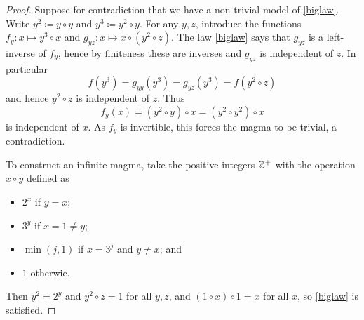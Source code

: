 \begin{proof}  Suppose for contradiction that we have a non-trivial model of \eqref{biglaw}. Write $y^2 \coloneqq y \circ y$ and $y^3 \coloneqq y^2 \circ y$. For any $y,z$, introduce the functions $f_y: x \mapsto y^3 \circ x$ and $g_{yz}: x \mapsto x \circ (y^2 \circ z)$.  The law \eqref{biglaw} says that $g_{yz}$ is a left-inverse of $f_y$, hence by finiteness these are inverses and $g_{yz}$ is independent of $z$. In particular
$$ f(y^3) = g_{yy}(y^3) = g_{yz}(y^3) = f(y^2 \circ z)$$
and hence $y^2 \circ z$ is independent of $z$.  Thus
$$ f_y(x) = (y^2 \circ y) \circ x = (y^2 \circ y^2) \circ x$$
is independent of $x$.  As $f_y$ is invertible, this forces the magma to be trivial, a contradiction.

To construct an infinite magma, take the positive integers $\mathbb{Z}^+$ with the operation $x \circ y$ defined as
\begin{itemize}
  \item $2^x$ if $y=x$;
  \item $3^y$ if $x = 1 \neq y$;
  \item $\min(j,1)$ if $x=3^j$ and $y \neq x$; and
  \item $1$ otherwie.
\end{itemize}
Then $y^2 = 2^y$ and $y^2 \circ z = 1$ for all $y,z$, and $(1 \circ x) \circ 1 = x$ for all $x$, so \eqref{biglaw} is satisfied.
\end{proof}
